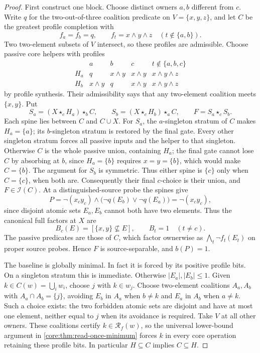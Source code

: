 \begin{proof}
First construct one block. Choose distinct owners $a,b$ different from $c$.
Write $q$ for the two-out-of-three coalition predicate on
$V=\{x,y,z\}$, and let $C$ be the greatest
profile completion with
\[
 f_a=f_b=q,\qquad
 f_t=x\land y\land z\quad(t\notin\{a,b\}).
\]
Two two-element subsets of $V$ intersect, so these profiles are
admissible. Choose passive core helpers with profiles
\[
 \begin{array}{c|cccc}
     &a&b&c&t\notin\{a,b,c\}\\\hline
 H_a&q&x\land y&x\land y&x\land y\land z\\
 H_b&x\land y&q&x\land y&x\land y\land z
 \end{array}
\]
by profile synthesis. Their admissibility says that any two-element
coalition meets $\{x,y\}$. Put
\[
 S_a=(X\star_c H_a)\star_b C,\qquad
 S_b=(X\star_c H_b)\star_a C,\qquad
 F=S_a\star_c S_b.
\]
Each spine lies between $C$ and $C\cup X$. For $S_a$, the $a$-singleton
stratum of $C$ makes $H_a=\{a\}$; its $b$-singleton stratum is
restored by the final gate. Every other singleton stratum forces all
passive inputs and the helper to that singleton. Otherwise $C$ is the
whole passive union, containing $H_a$; the final gate cannot lose $C$
by absorbing at $b$, since $H_a=\{b\}$ requires $x=y=\{b\}$,
which would make $C=\{b\}$. The argument for $S_b$ is symmetric.
Thus either spine is $\{c\}$ only when $C=\{c\}$, when both are.
Consequently their final $c$-choice is their union, and $F\in\mathcal I(C)$.
At a distinguished-source probe the spines give
\[
 P=\neg(x_cy_c)\land\bigl(\neg q(E_b)\lor\neg q(E_a)\bigr)
   =\neg(x_cy_c),
\]
since disjoint atomic sets $E_a,E_b$ cannot both have two elements.
Thus the canonical full factors at $X$ are
\[
 B_c(E)=[\{x,y\}\nsubseteq E],\qquad B_t=1\quad(t\ne c).
\]
The passive predicates are those of $C$, which factor ownerwise as
$\bigwedge_t\neg f_t(E_t)$ on proper source probes. Hence $F$ is
source-separable, and $b(P)=1$.

The baseline is globally minimal. In fact it is forced by its positive
profile bits. On a singleton stratum this is immediate. Otherwise
$|E_a|,|E_b|\leq1$. Given $k\in C(w)=\bigcup_iw_i$, choose
$j$ with $k\in w_j$. Choose two-element coalitions $A_a,A_b$ with
$A_a\cap A_b=\{j\}$, avoiding $E_b$ in $A_a$ when $b\ne k$ and
$E_a$ in $A_b$ when $a\ne k$. Such a choice exists: the two forbidden
atomic sets are disjoint and have at most one element, neither equal
to $j$ when its avoidance is required. Take $V$ at all other owners.
These coalitions certify $k\in\mathcal R_f(w)$, so the universal
lower-bound argument in \cref{core:thm:read-once-minimum} forces $k$
in every core operation retaining these profile bits. In particular
$H\subseteq C$ implies $C\subseteq H$.


\end{proof}
